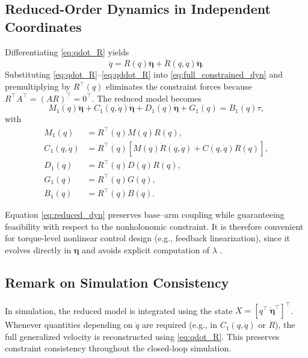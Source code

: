 \documentclass[conference]{IEEEtran}
\newcommand{\etav}{\bm{\eta}}
\begin{document}
\subsection{Reduced-Order Dynamics in Independent Coordinates}
\label{subsec:reduced_dyn}

Differentiating \eqref{eq:qdot_R} yields
\begin{equation}
\ddot q = R(q)\ddot{\etav} + \dot R(q,\dot q)\dot{\etav}.
\label{eq:qddot_R}
\end{equation}
Substituting \eqref{eq:qdot_R}--\eqref{eq:qddot_R} into \eqref{eq:full_constrained_dyn} and premultiplying by $R^\top(q)$ eliminates the constraint forces because
$R^\top A^\top = (AR)^\top = 0^\top$. The reduced model becomes
\begin{equation}
M_1(q)\ddot{\etav}
+
C_1(q,\dot q)\dot{\etav}
+
D_1(q)\dot{\etav}
+
G_1(q)
=
B_1(q)\tau,
\label{eq:reduced_dyn}
\end{equation}
with
\begin{align}
M_1(q) &= R^\top(q)M(q)R(q),\\
C_1(q,\dot q) &= R^\top(q)\!\left[M(q)\dot R(q,\dot q)+C(q,\dot q)R(q)\right],\\
D_1(q) &= R^\top(q)D(q)R(q),\\
G_1(q) &= R^\top(q)G(q),\\
B_1(q) &= R^\top(q)B(q).
\end{align}

Equation \eqref{eq:reduced_dyn} preserves base--arm coupling while guaranteeing feasibility with respect to the nonholonomic constraint. It is therefore convenient for torque-level nonlinear control design (e.g., feedback linearization), since it evolves directly in $\etav$ and avoids explicit computation of $\lambda$ \cite{prada-jimenezCoupledDynamicModel2019a}.

\subsection{Remark on Simulation Consistency}
\label{subsec:sim_consistency}

In simulation, the reduced model is integrated using the state
$X=[q^\top~\dot{\etav}^\top]^\top$. Whenever quantities depending on $\dot q$
are required (e.g., in $C_1(q,\dot q)$ or $\dot R$), the full generalized
velocity is reconstructed using \eqref{eq:qdot_R}. This preserves constraint
consistency throughout the closed-loop simulation.
\end{document}
